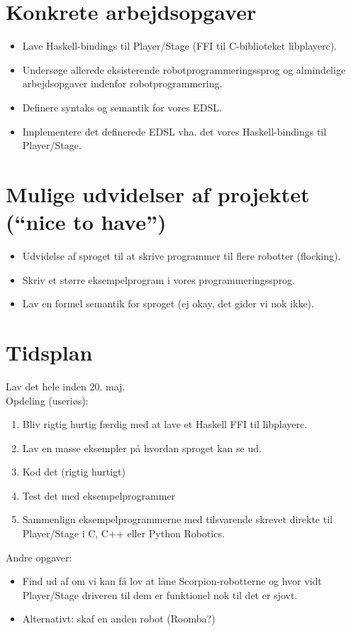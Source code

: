 \documentclass[a4paper,oneside, final]{memoir}
\begin{document}
\section{Konkrete arbejdsopgaver}

\begin{itemize}
\item Lave Haskell-bindings til Player/Stage (FFI til C-biblioteket libplayerc).
\item Undersøge allerede eksisterende robotprogrammeringssprog og
  almindelige arbejdsopgaver indenfor robotprogrammering.
\item Definere syntaks og semantik for vores EDSL.
\item Implementere det definerede EDSL vha. det vores Haskell-bindings
  til Player/Stage.
\end{itemize}

\section{Mulige udvidelser af projektet (``nice to have'')}
\begin{itemize}
\item Udvidelse af sproget til at skrive programmer til flere robotter (flocking).
\item Skriv et større eksempelprogram i vores programmeringssprog.
\item Lav en formel semantik for sproget (ej okay, det gider vi nok ikke).
\end{itemize}

\section{Tidsplan}
Lav det hele inden 20. maj.\\

\noindent
Opdeling (useriøs):
\begin{enumerate}
\item Bliv rigtig hurtig færdig med at lave et Haskell FFI til libplayerc.
\item Lav en masse eksempler på hvordan sproget kan se ud.
\item Kod det (rigtig hurtigt)
\item Test det med eksempelprogrammer
\item Sammenlign eksempelprogrammerne med tilsvarende skrevet direkte
  til Player/Stage i C, C++ eller Python Robotics.
\end{enumerate}

\noindent
Andre opgaver:
\begin{itemize}
\item Find ud af om vi kan få lov at låne Scorpion-robotterne og hvor
  vidt Player/Stage driveren til dem er funktionel nok til det er sjovt.
\item Alternativt: skaf en anden robot (Roomba?)
\end{itemize}
\end{document}
